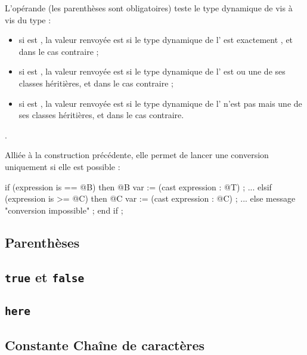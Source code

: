 
L'opérande  (les parenthèses sont obligatoires) teste le type dynamique de  vis à vis du type  :
\begin{itemize}
\item si  est \galgas{==}, la valeur renvoyée est  si le type dynamique de l' est exactement , et  dans le cas contraire ;
\item si  est \galgas{>=}, la valeur renvoyée est  si le type dynamique de l' est  ou une de ses classes héritières, et  dans le cas contraire ;
\item si  est \galgas{>}, la valeur renvoyée est  si le type dynamique de l' n'est pas  mais une de ses classes héritières, et  dans le cas contraire.
\end{itemize}


.

Alliée à la construction précédente, elle permet de lancer une conversion uniquement si elle est possible :

\begin{galgascode}
if (expression is == @B) then
  @B var := (cast expression : @T) ;
  ...
elsif (expression is >= @C) then
  @C var := (cast expression : @C) ;
  ...
else
  message "conversion impossible" ;
end if ;
\end{galgascode}

\subsection{Parenthèses}


\subsection{\texttt{true} et \texttt{false}}

\subsection{\texttt{here}}

\subsection{Constante Chaîne de caractères}

